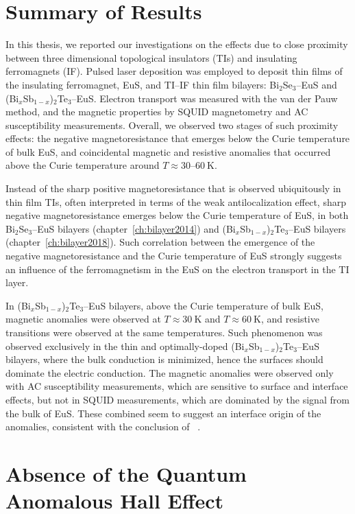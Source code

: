 \section{Summary of Results}
In this thesis, we reported our investigations on the effects due to close proximity between three dimensional topological insulators (TIs) and insulating ferromagnets (IF). Pulsed laser deposition was employed to deposit thin films of the insulating ferromagnet, EuS, and TI--IF thin film bilayers: Bi$_2$Se$_3$--EuS and (Bi$_x$Sb$_{1-x}$)$_2$Te$_3$--EuS. Electron transport was measured with the van der Pauw method, and the magnetic properties by SQUID magnetometry and AC susceptibility measurements. Overall, we observed two stages of such proximity effects: the negative magnetoresistance that emerges below the Curie temperature of bulk EuS, and coincidental magnetic and resistive anomalies that occurred above the Curie temperature around $T\approx30$--$60~\mathrm{K}$.

Instead of the sharp positive magnetoresistance that is observed ubiquitously in thin film TIs, often interpreted in terms of the weak antilocalization effect, sharp negative magnetoresistance emerges below the Curie temperature of EuS, in both Bi$_2$Se$_3$--EuS bilayers (chapter~\ref{ch:bilayer2014}) and (Bi$_x$Sb$_{1-x}$)$_2$Te$_3$--EuS bilayers (chapter~\ref{ch:bilayer2018}). Such correlation between the emergence of the negative magnetoresistance and the Curie temperature of EuS strongly suggests an influence of the ferromagnetism in the EuS on the electron transport in the TI layer.

In (Bi$_x$Sb$_{1-x}$)$_2$Te$_3$--EuS bilayers, above the Curie temperature of bulk EuS, magnetic anomalies were observed at $T\approx30~\mathrm{K}$ and $T\approx60~\mathrm{K}$, and resistive transitions were observed at the same temperatures. Such phenomenon was observed exclusively in the thin and optimally-doped (Bi$_x$Sb$_{1-x}$)$_2$Te$_3$--EuS bilayers, where the bulk conduction is minimized, hence the surfaces should dominate the electric conduction. The magnetic anomalies were observed only with AC susceptibility measurements, which are sensitive to surface and interface effects, but not in SQUID measurements, which are dominated by the signal from the bulk of EuS. These combined seem to suggest an interface origin of the anomalies, consistent with the conclusion of \citeauthor{Moodera2016}~\cite{Moodera2016}.

\section{Absence of the Quantum Anomalous Hall Effect}

